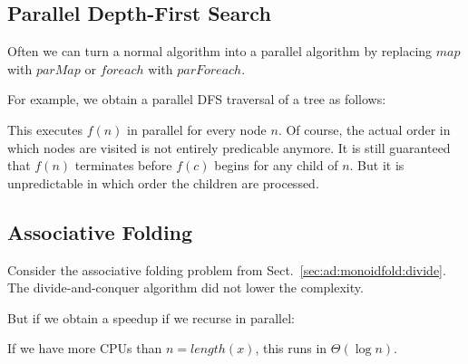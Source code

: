 \subsection{Parallel Depth-First Search}

Often we can turn a normal algorithm into a parallel algorithm by replacing $map$ with $parMap$ or $foreach$ with $parForeach$.

For example, we obtain a parallel DFS traversal of a tree as follows:
\begin{acode}
\end{acode}

This executes $f(n)$ in parallel for every node $n$.
Of course, the actual order in which nodes are visited is not entirely predicable anymore.
It is still guaranteed that $f(n)$ terminates before $f(c)$ begins for any child of $n$.
But it is unpredictable in which order the children are processed.


\subsection{Associative Folding}\label{sec:ad:monoidfold:parallel}

Consider the associative folding problem from Sect.~\ref{sec:ad:monoidfold:divide}.
The divide-and-conquer algorithm did not lower the complexity.

But if we obtain a speedup if we recurse in parallel:

\begin{acode}
\end{acode}

If we have more CPUs than $n=length(x)$, this runs in $\Theta(\log n)$.

